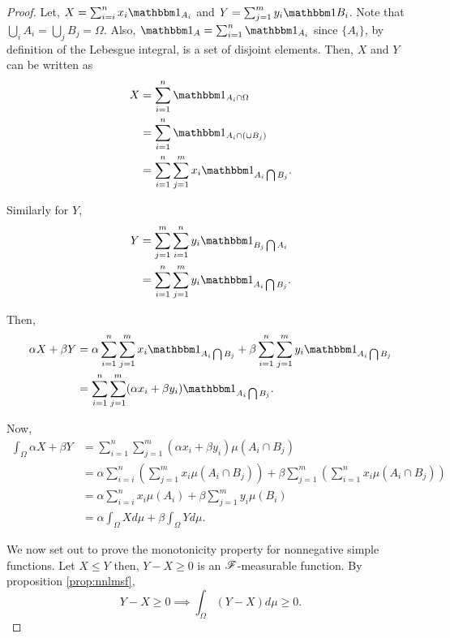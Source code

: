 \documentclass[../TGMAFFIRO.tex]{subfiles}
\begin{document}
\begin{proof}
	Let, $X = \sum_{i=i}^{n}x_i\ind_{A_i}$ and $Y = \sum_{j=1}^{m}y_i\ind{B_i}$. Note that $\bigcup_i A_i = \bigcup_j B_j = \Omega$. Also, $\ind_A = \sum_{i=1}^{n}\ind_{A_i}$ since $\{A_i\}$, by definition of the Lebesgue integral, is a set of disjoint elements. Then, $X$ and $Y$ can be written as
	\begin{align*}
		X	&= \sum_{i=1}^{n}\ind_{A_i\cap\Omega} \\
			&= \sum_{i=1}^{n}\ind_{A_i\cap\left(\cup B_j\right)}\\
			&= \sum_{i=1}^{n} \sum_{j=1}^{m} x_i \ind_{A_i \bigcap B_j}.
	\end{align*}
	
	Similarly for $Y$,
	\begin{align*}
		Y	&= \sum_{j=1}^{m} \sum_{i=1}^{n} y_i \ind_{B_j \bigcap A_i} \\
			&= \sum_{i=1}^{n} \sum_{j=1}^{m} y_i \ind_{A_i \bigcap B_j}.
	\end{align*}
	
	Then,
	\begin{align*}
		\alpha X + \beta Y  &= \alpha \sum_{i=1}^{n} \sum_{j=1}^{m} x_i \ind_{A_i \bigcap B_j} + \beta \sum_{i=1}^{n} \sum_{j=1}^{m} y_i \ind_{A_i \bigcap B_j} \\
				&= \sum_{i=1}^{n} \sum_{j=1}^{m} (\alpha x_i + \beta y_i) \ind_{A_i \bigcap B_j}.
	\end{align*}
	
	Now, 
	\begin{align*}
		\int_\Omega\alpha X+\beta Y &= \sum_{i=1}^{n} \sum_{j=1}^{m} (\alpha x_i + \beta y_i) \mu(A_i \cap B_j) \\
		&= \alpha \sum_{i=i}^{n}\left(\sum_{j=1}^{m} x_i \mu(A_i\cap B_j) \right) + \beta \sum_{j=1}^{m}\left(\sum_{i=1}^{n} x_i \mu(A_i\cap B_j) \right)\\
		&= \alpha \sum_{i=i}^{n}x_i \mu(A_i) + \beta\sum_{j=1}^{m} y_i \mu(B_i) \\
		&= \alpha \int_\Omega X d\mu + \beta\int_\Omega Y d\mu.
	\end{align*}
	
	We now set out to prove the monotonicity property for nonnegative simple functions. 
	Let $X \leq Y$ then, $Y - X \geq 0$ is an $\mathscr{F}$-measurable function. By proposition \ref{prop:nnlmsf},
	\begin{equation}
		Y - X \geq 0 \implies \int_\Omega (Y - X) d\mu \geq 0.
	\end{equation}	
\end{proof}
\end{document}
